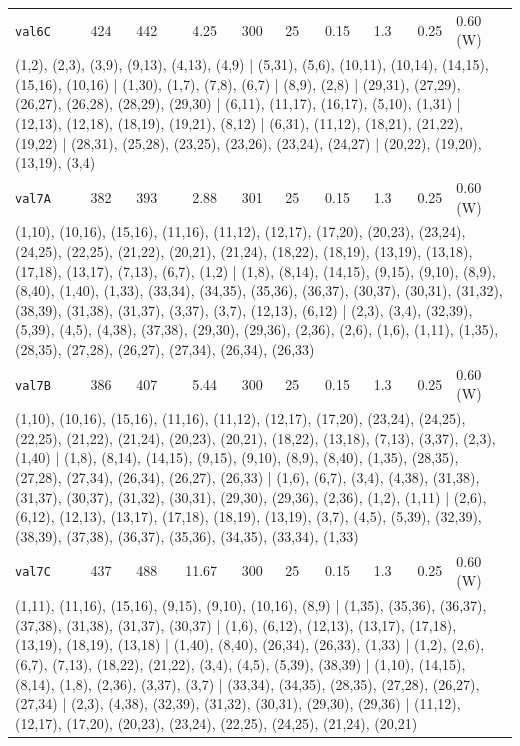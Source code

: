 \begin{longtable}{lrrrrrrrrl}
\texttt{val6C} & 424 & 442 & 4.25 & 300 & 25 & 0.15 & 1.3 & 0.25 & 0.60\,(W) \\
\multicolumn{10}{p{0.96\linewidth}}{\tiny\raggedright\arraybackslash (1,2), (2,3), (3,9), (9,13), (4,13), (4,9) | (5,31), (5,6), (10,11), (10,14), (14,15), (15,16), (10,16) | (1,30), (1,7), (7,8), (6,7) | (8,9), (2,8) | (29,31), (27,29), (26,27), (26,28), (28,29), (29,30) | (6,11), (11,17), (16,17), (5,10), (1,31) | (12,13), (12,18), (18,19), (19,21), (8,12) | (6,31), (11,12), (18,21), (21,22), (19,22) | (28,31), (25,28), (23,25), (23,26), (23,24), (24,27) | (20,22), (19,20), (13,19), (3,4)} \\[2pt]
\texttt{val7A} & 382 & 393 & 2.88 & 301 & 25 & 0.15 & 1.3 & 0.25 & 0.60\,(W) \\
\multicolumn{10}{p{0.96\linewidth}}{\tiny\raggedright\arraybackslash (1,10), (10,16), (15,16), (11,16), (11,12), (12,17), (17,20), (20,23), (23,24), (24,25), (22,25), (21,22), (20,21), (21,24), (18,22), (18,19), (13,19), (13,18), (17,18), (13,17), (7,13), (6,7), (1,2) | (1,8), (8,14), (14,15), (9,15), (9,10), (8,9), (8,40), (1,40), (1,33), (33,34), (34,35), (35,36), (36,37), (30,37), (30,31), (31,32), (38,39), (31,38), (31,37), (3,37), (3,7), (12,13), (6,12) | (2,3), (3,4), (32,39), (5,39), (4,5), (4,38), (37,38), (29,30), (29,36), (2,36), (2,6), (1,6), (1,11), (1,35), (28,35), (27,28), (26,27), (27,34), (26,34), (26,33)} \\[2pt]
\texttt{val7B} & 386 & 407 & 5.44 & 300 & 25 & 0.15 & 1.3 & 0.25 & 0.60\,(W) \\
\multicolumn{10}{p{0.96\linewidth}}{\tiny\raggedright\arraybackslash (1,10), (10,16), (15,16), (11,16), (11,12), (12,17), (17,20), (23,24), (24,25), (22,25), (21,22), (21,24), (20,23), (20,21), (18,22), (13,18), (7,13), (3,37), (2,3), (1,40) | (1,8), (8,14), (14,15), (9,15), (9,10), (8,9), (8,40), (1,35), (28,35), (27,28), (27,34), (26,34), (26,27), (26,33) | (1,6), (6,7), (3,4), (4,38), (31,38), (31,37), (30,37), (31,32), (30,31), (29,30), (29,36), (2,36), (1,2), (1,11) | (2,6), (6,12), (12,13), (13,17), (17,18), (18,19), (13,19), (3,7), (4,5), (5,39), (32,39), (38,39), (37,38), (36,37), (35,36), (34,35), (33,34), (1,33)} \\[2pt]
\texttt{val7C} & 437 & 488 & 11.67 & 300 & 25 & 0.15 & 1.3 & 0.25 & 0.60\,(W) \\
\multicolumn{10}{p{0.96\linewidth}}{\tiny\raggedright\arraybackslash (1,11), (11,16), (15,16), (9,15), (9,10), (10,16), (8,9) | (1,35), (35,36), (36,37), (37,38), (31,38), (31,37), (30,37) | (1,6), (6,12), (12,13), (13,17), (17,18), (13,19), (18,19), (13,18) | (1,40), (8,40), (26,34), (26,33), (1,33) | (1,2), (2,6), (6,7), (7,13), (18,22), (21,22), (3,4), (4,5), (5,39), (38,39) | (1,10), (14,15), (8,14), (1,8), (2,36), (3,37), (3,7) | (33,34), (34,35), (28,35), (27,28), (26,27), (27,34) | (2,3), (4,38), (32,39), (31,32), (30,31), (29,30), (29,36) | (11,12), (12,17), (17,20), (20,23), (23,24), (22,25), (24,25), (21,24), (20,21)} \\[2pt]

\end{longtable}
